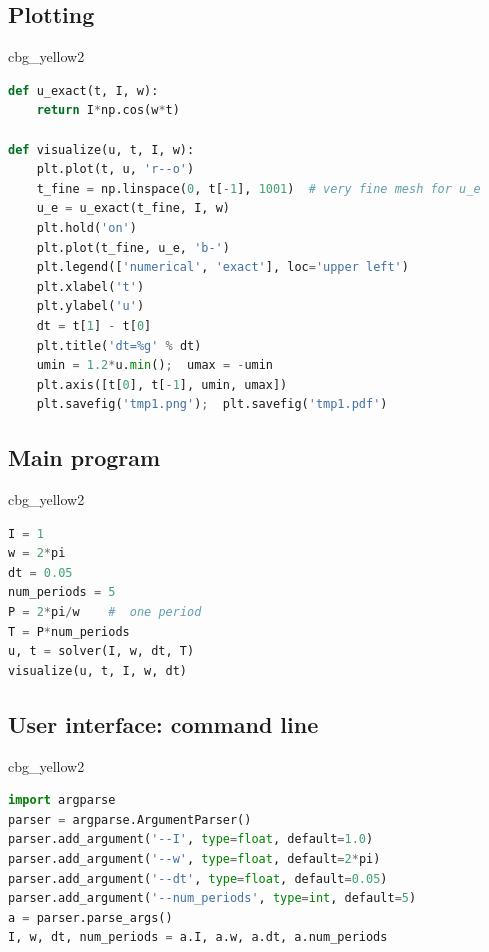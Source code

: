 \documentclass[%
oneside,                 %
final,                   %
10pt]{article}
\newenvironment{_cod_tight}[1]{
   \def\FrameCommand{\colorbox{#1}}
   \FrameRule0.6pt\MakeFramed {\FrameRestore}\vskip3mm}
   {\vskip0mm\endMakeFramed}
\newenvironment{cod}[1]{
\bgroup\rmfamily
\fboxsep=0mm\relax
\begin{_cod_tight}{#1}
\list{}{\parsep=-2mm\parskip=0mm\topsep=0pt\leftmargin=2mm
\rightmargin=2\leftmargin\leftmargin=4pt\relax}
\item\relax}
{\endlist\end{_cod_tight}\egroup}
\begin{document}
\subsection*{Plotting}

\begin{cod}{cbg_yellow2}\begin{lstlisting}[language=Python,style=simple,xleftmargin=2mm]
def u_exact(t, I, w):
    return I*np.cos(w*t)

def visualize(u, t, I, w):
    plt.plot(t, u, 'r--o')
    t_fine = np.linspace(0, t[-1], 1001)  # very fine mesh for u_e
    u_e = u_exact(t_fine, I, w)
    plt.hold('on')
    plt.plot(t_fine, u_e, 'b-')
    plt.legend(['numerical', 'exact'], loc='upper left')
    plt.xlabel('t')
    plt.ylabel('u')
    dt = t[1] - t[0]
    plt.title('dt=%g' % dt)
    umin = 1.2*u.min();  umax = -umin
    plt.axis([t[0], t[-1], umin, umax])
    plt.savefig('tmp1.png');  plt.savefig('tmp1.pdf')
\end{lstlisting}\end{cod}
\noindent

\subsection*{Main program}

\begin{cod}{cbg_yellow2}\begin{lstlisting}[language=Python,style=simple,xleftmargin=2mm]
I = 1
w = 2*pi
dt = 0.05
num_periods = 5
P = 2*pi/w    #  one period
T = P*num_periods
u, t = solver(I, w, dt, T)
visualize(u, t, I, w, dt)
\end{lstlisting}\end{cod}
\noindent

\subsection*{User interface: command line}

\begin{cod}{cbg_yellow2}\begin{lstlisting}[language=Python,style=simple,xleftmargin=2mm]
import argparse
parser = argparse.ArgumentParser()
parser.add_argument('--I', type=float, default=1.0)
parser.add_argument('--w', type=float, default=2*pi)
parser.add_argument('--dt', type=float, default=0.05)
parser.add_argument('--num_periods', type=int, default=5)
a = parser.parse_args()
I, w, dt, num_periods = a.I, a.w, a.dt, a.num_periods
\end{lstlisting}\end{cod}
\noindent
\end{document}
